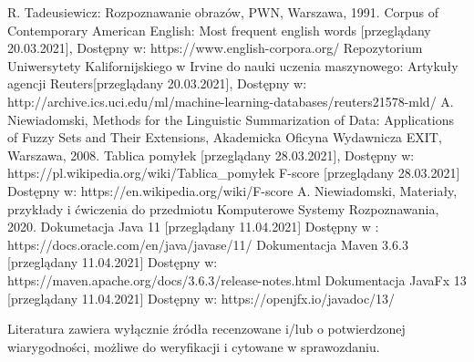 \documentclass{classrep}
\begin{document}
\begin{thebibliography}{0}
 R. Tadeusiewicz: Rozpoznawanie obrazów, PWN, Warszawa, 1991.  
 Corpus of Contemporary American English: Most frequent english words [przeglądany  20.03.2021], Dostępny w: https://www.english-corpora.org/
 Repozytorium Uniwersytety Kalifornijskiego w Irvine do nauki uczenia maszynowego: Artykuły agencji Reuters[przeglądany 20.03.2021], 
Dostępny w: http://archive.ics.uci.edu/ml/machine-learning-databases/reuters21578-mld/
 A. Niewiadomski, Methods for the Linguistic Summarization of Data: Applications of Fuzzy Sets and Their Extensions, Akademicka Oficyna Wydawnicza EXIT, Warszawa, 2008.
 Tablica pomyłek [przeglądany 28.03.2021], Dostępny w: https://pl.wikipedia.org/wiki/Tablica\_pomyłek
 F-score [przeglądany 28.03.2021] Dostępny w: https://en.wikipedia.org/wiki/F-score
 A. Niewiadomski, Materiały, przykłady i ćwiczenia do przedmiotu Komputerowe Systemy Rozpoznawania, 2020.
 Dokumetacja Java 11 [przeglądany 11.04.2021] Dostępny w : https://docs.oracle.com/en/java/javase/11/
 Dokumentacja Maven 3.6.3 [przeglądany 11.04.2021] Dostępny w: https://maven.apache.org/docs/3.6.3/release-notes.html
 Dokumentacja JavaFx 13 [przeglądany 11.04.2021] Dostępny w: https://openjfx.io/javadoc/13/ 
\end{thebibliography}

Literatura zawiera wyłącznie źródła recenzowane i/lub o potwierdzonej wiarygodności,
możliwe do weryfikacji i cytowane w sprawozdaniu. 
\end{document}
